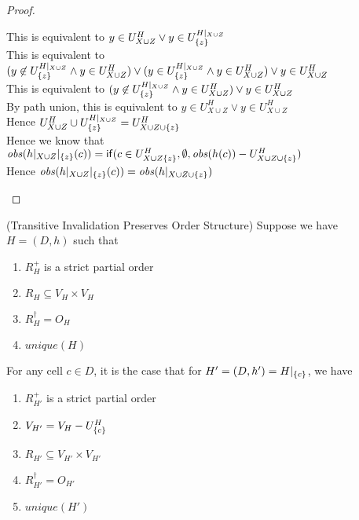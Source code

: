 \begin{proof}
\begin{tabbedproof}
\ooooo This is equivalent to $y \in U^H_{X \cup Z} \vee y \in U^{H|_{X \cup Z}}_{\{{z}\}}$ \\
\ooooo This is equivalent to $(y \not\in U^{H|_{X \cup Z}}_{\{{z}\}} \land y \in U^H_{X \cup Z}) \vee (y \in U^{H|_{X \cup Z}}_{\{{z}\}} \land y \in U^H_{X \cup Z}) \vee y \in U^H_{X \cup Z}$ \\
\ooooo This is equivalent to $(y \not\in U^{H|_{X \cup Z}}_{\{{z}\}} \land y \in U^H_{X \cup Z}) \vee y \in U^H_{X \cup Z}$ \\
\ooooo By path union, this is equivalent to $y \in U^H_{X \cup Z} \vee y \in U^H_{X \cup Z}$ \\
\ooooo Hence $U^H_{X \cup Z} \cup U^{H|_{X \cup Z}}_{\{{z}\}} = U^H_{X \cup Z \cup \{{z}\}}$ \\
\ooooo Hence we know that \\
\ooooo $\mathit{obs}(h|_{X \cup Z}|_{\{{z}\}}(c)) = \mathsf{if}({c \in U^H_{X \cup Z \{{z}\}}}, {\emptyset}, {\mathit{obs}(h(c)) - U^H_{X \cup Z \cup \{{z}\}}})$\\
\ooooo Hence $\mathit{obs}(h|_{X \cup Z}|_{\{{z}\}}(c)) = \mathit{obs}(h|_{X \cup Z \cup \{{z}\}})$ \\
\end{tabbedproof}
\end{proof}

\begin{lemma}{(Transitive Invalidation Preserves Order Structure)}
Suppose we have $H = (D,h)$ such that 
\begin{enumerate}
\item $R^+_H$ is a strict partial order 
\item $R_H \subseteq V_H \times V_H$
\item $R^\dagger_H = O_H$ 
\item $\mathit{unique}(H)$
\end{enumerate}
\noindent For any cell $c \in D$, it is the case that for $H' = (D, h') = H|_{\{{c}\}}$, we have
\begin{enumerate}
\item $R^+_{H'}$ is a strict partial order 
\item $V_{H'} = V_H - U^H_{\{{c}\}}$
\item $R_{H'} \subseteq V_{H'} \times V_{H'}$
\item $R^\dagger_{H'} = O_{H'}$ 
\item $\mathit{unique}(H')$
\end{enumerate}
\end{lemma}


